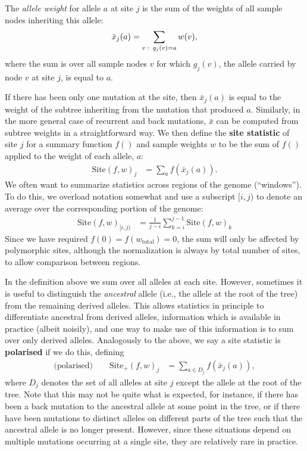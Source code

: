 \documentclass{article}
\newcommand{\site}{\mbox{Site}} %
\newcommand{\sitep}{\mbox{Site}_+} %
\newcommand{\iw}{w} %
\newcommand{\tiw}{w_\text{total}} %
\newcommand{\aw}{{\bar x}} %
\begin{document}
\begin{definition}
    The \emph{allele weight} for allele $a$ at site $j$ is the sum of the weights
    of all sample nodes inheriting this allele:
    \begin{align*}
        \aw_j(a) = \sum_{v \st g_j(v) = a} \iw(v) ,
    \end{align*}
    where the sum is over all sample nodes $v$ for which
    $g_j(v)$, the allele carried by node $v$ at site $j$, is equal to $a$.
\end{definition}

If there has been only one mutation at the site,
then $\aw_j(a)$ is equal to the weight of the subtree inheriting from the mutation that produced $a$.
Similarly, in the more general case of recurrent and back mutations, $\aw$ can
be computed from subtree weights in a straightforward way.
We then define the \textbf{site statistic} of site $j$ for a summary function $f()$
and sample weights $\iw$ to be the sum of $f()$ applied to the weight of
each allele, $a$:
\begin{align}
    \site(f, \iw)_j
    &=
    \sum_{a} f(\aw_j(a)).
\end{align}
We often want to summarize statistics across regions of the genome (``windows'').
To do this, we overload notation somewhat and use a subscript $[i,j)$ to denote an average
over the corresponding portion of the genome:
\begin{align}
    \site(f, \iw)_{[i,j)}
    &=
    \frac{1}{j-i} \sum_{k=i}^{j-1} \site(f, \iw)_k
\end{align}
Since we have required $f(0) = f(\tiw) = 0$,
the sum will only be affected by polymorphic sites,
although the normalization is always by total number of sites, to allow comparison between regions.


In the definition above we sum over all alleles at each site.
However, sometimes it is useful to distinguish the \emph{ancestral} allele
(i.e., the allele at the root of the tree) from the remaining derived alleles.
This allows statistics in principle to differentiate ancestral from derived alleles,
information which is available in practice (albeit noisily),
and one way to make use of this information is to sum over only derived alleles.
Analogously to the above,
we say a site statistic is \textbf{polarised} if we do this,
defining
\begin{align} \label{eqn:site_polarised}
    \text{(polarised)} \qquad
    \sitep(f, \iw)_j
    &=
    \sum_{a \in D_j} f(\aw_j(a)) ,
\end{align}
where $D_j$ denotes the set of all alleles at site $j$ except the allele at the root of the tree.
Note that this may not be quite what is expected,
for instance, if there has been a back mutation to the ancestral allele at some point in the tree,
or if there have been mutations to distinct alleles on different parts of the tree
such that the ancestral allele is no longer present.
However, since these situations depend on multiple mutations occurring at a single site,
they are relatively rare in practice.
\end{document}
